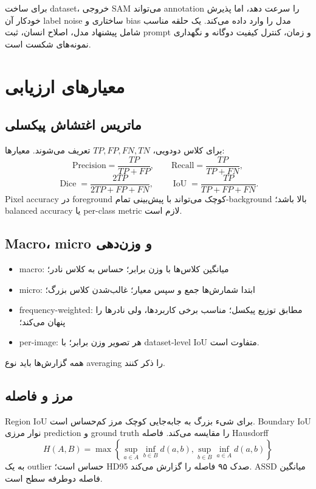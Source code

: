 \documentclass[12pt,openany,oneside]{book}
\newcommand{\IoU}{\operatorname{IoU}}
\newcommand{\Dice}{\operatorname{Dice}}
\begin{document}
\begin{researchbox}
برای ساخت dataset، خروجی SAM می‌تواند annotation را سرعت دهد، اما پذیرش خودکار آن label noise ساختاری و bias مدل
را وارد داده می‌کند. یک حلقه مناسب شامل پیشنهاد مدل، اصلاح انسان، ثبت prompt و زمان، کنترل کیفیت دوگانه و نگهداری
نمونه‌های شکست است.
\end{researchbox}

\section{معیارهای ارزیابی}
\subsection{ماتریس اغتشاش پیکسلی}
برای کلاس دودویی، \(TP,FP,FN,TN\) تعریف می‌شوند. معیارها:
\[
\mathrm{Precision}=\frac{TP}{TP+FP},\qquad
\mathrm{Recall}=\frac{TP}{TP+FN},
\]
\[
\Dice=\frac{2TP}{2TP+FP+FN},
\qquad
\IoU=\frac{TP}{TP+FP+FN}.
\]
Pixel accuracy در foreground کوچک می‌تواند با پیش‌بینی تمام-background بالا باشد؛ balanced accuracy یا per-class
metric لازم است.

\subsection{Macro، micro و وزن‌دهی}
\begin{itemize}
\item macro: میانگین کلاس‌ها با وزن برابر؛ حساس به کلاس نادر؛
\item micro: ابتدا شمارش‌ها جمع و سپس معیار؛ غالب‌شدن کلاس بزرگ؛
\item frequency-weighted: مطابق توزیع پیکسل؛ مناسب برخی کاربردها، ولی نادرها را پنهان می‌کند؛
\item per-image: هر تصویر وزن برابر؛ با dataset-level IoU متفاوت است.
\end{itemize}
همه گزارش‌ها باید نوع averaging را ذکر کنند.

\subsection{مرز و فاصله}
Region IoU برای شیء بزرگ به جابه‌جایی کوچک مرز کم‌حساس است. Boundary IoU نوار مرزی prediction و ground truth را
مقایسه می‌کند. فاصله Hausdorff
\[
H(A,B)=\max\left\{\sup_{a\in A}\inf_{b\in B}d(a,b),
\sup_{b\in B}\inf_{a\in A}d(a,b)\right\}
\]
به یک outlier حساس است؛ HD95 صدک ۹۵ فاصله را گزارش می‌کند. ASSD میانگین فاصله دوطرفه سطح است.
\end{document}
